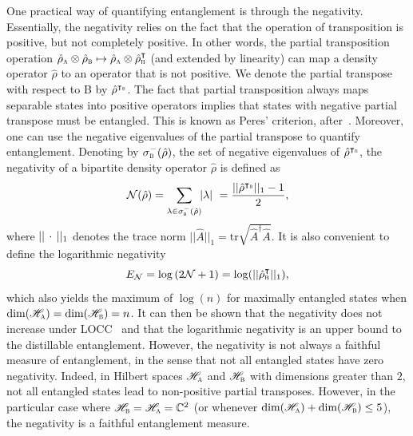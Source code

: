 \documentclass[letterpaper,12pt,titlepage,oneside,final]{book}
\renewcommand{\r}{\hat{\rho}}
\newcommand{\tc}[1]{\textsc{#1}}
\begin{document}
One practical way of quantifying entanglement is through the negativity. Essentially, the negativity relies on the fact that the operation of transposition is positive, but not completely positive. In other words, the partial transposition operation $\r_\tc{a}\otimes \r_\tc{b}\mapsto \r_\tc{a}\otimes\r_\tc{b}^\intercal$ (and extended by linearity) can map a density operator $\r$ to an operator that is not positive. We denote the partial transpose with respect to B by $\r^{\intercal_\tc{b}}$. The fact that partial transposition always maps separable states into positive operators implies that states with negative partial transpose must be entangled. This is known as Peres' criterion, after~\cite{Peres,HorodeckiPeres}. Moreover, one can use the negative eigenvalues of the partial transpose to quantify entanglement. Denoting by $\sigma_\tc{b}^-(\r)$, the set of negative eigenvalues of $\r^{\intercal_\tc{b}}$, the negativity of a bipartite density operator $\r$ is defined as~\cite{negativityOG}
\begin{equation}\label{eq:negativity}
    \mathcal{N}(\r) = \sum_{\lambda\in \sigma_\tc{b}^-(\r)}\!\! |\lambda| \,\,= \frac{||\r^{\intercal_\tc{b}}||_{1} - 1}{2},
\end{equation}
where $|| \, \cdot \, ||_\tc{1}$ denotes the trace norm $||\hat{A}||_1 = \text{tr}\sqrt{\hat{A}^\dagger\hat{A}}$. It is also convenient to define the logarithmic negativity
\begin{equation}
    E_\mathcal{N} = \log\left(2\mathcal{N} + 1\right) = \log(||\r^\intercal_\tc{b}||_1),
\end{equation}
which also yields the maximum of $\log(n)$ for maximally entangled states when $\text{dim}(\mathscr{H}_\tc{a})=\text{dim}(\mathscr{H}_\tc{b}) = n$. It can then be shown that the negativity does not increase under LOCC~\cite{Plenio} and that the logarithmic negativity is an upper bound to the distillable entanglement. However, the negativity is not always a faithful measure of entanglement, in the sense that not all entangled states have zero negativity. Indeed, in Hilbert spaces $\mathscr{H}_\tc{a}$ and $\mathscr{H}_\tc{b}$ with dimensions greater than $2$, not all entangled states lead to non-positive partial transposes. However, in the particular case where $\mathscr{H}_\tc{b} = \mathscr{H}_\tc{a} = \mathbb{C}^2$ (or whenever $\text{dim}(\mathscr{H}_\tc{a})+ \text{dim}(\mathscr{H}_\tc{b}) \leq 5$), the negativity is a faithful entanglement measure. 
\end{document}
